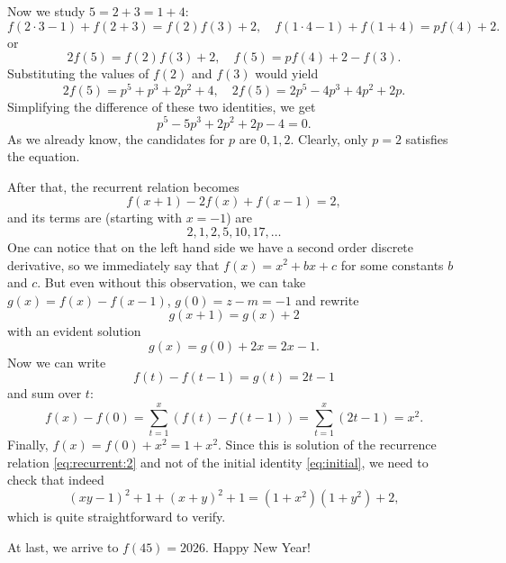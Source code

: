 \documentclass[12pt, a4paper]{article}
\begin{document}
Now we study $5 = 2+3 = 1+4$:
\[f(2\cdot 3 - 1) + f (2+3) = f(2) f(3)+2,\quad f(1\cdot4-1)+f(1+4)=pf(4)+2.\]
or
\[
2f(5) = f(2)f(3)+2,\quad f(5) = p f(4)+2 - f(3).\]
Substituting the values of $f(2)$ and $f(3)$ would yield
\[
2f(5)= p^5 + p^3 + 2p^2 + 4, \quad 2f(5) = 2p^5-4p^3+4p^2+2p.
\]
Simplifying the difference of these two identities, we get
\[
p^5-5p^3+2p^2+2p-4 = 0.
\]
As we already know, the candidates for $p$ are $0,1,2$.
Clearly, only $p=2$ satisfies the equation.

After that, the recurrent relation becomes
\begin{equation}
f(x+1) - 2f(x) + f (x-1) = 2, \label{eq:recurrent:2}
\end{equation}
and its terms are (starting with $x=-1$) are
\[2, 1, 2, 5, 10, 17,\ldots\]
One can notice that on the left hand side we have a second order discrete derivative,
so we immediately say that $f(x) = x^2 + bx + c$ for some constants $b$ and $c$.
But even without this observation, we can take $g(x) = f(x) - f(x-1)$, $g(0) = z - m = -1$ and rewrite
\[g(x+1) = g(x) + 2\]
with an evident solution
\[
g (x) = g(0) + 2x = 2 x - 1.
\]
Now we can write
\[
f(t) - f(t-1) = g(t) = 2 t - 1
\]
and sum over $t$:
\[
f(x) - f(0) = \sum_{t=1}^x (f(t) - f(t-1)) = \sum_{t=1}^x (2 t - 1) = x^2.
\]
Finally, $f(x) = f(0) + x^2 = 1 + x^2$.
Since this is solution of the recurrence relation \eqref{eq:recurrent:2} and not of the initial identity \eqref{eq:initial}, we need to check that indeed
\[
(xy-1)^2+1 + (x+y)^2+1 = (1+x^2)(1+y^2) + 2,
\]
which is quite straightforward to verify.

At last, we arrive to $f(45) = 2026$. Happy New Year!
\end{document}
